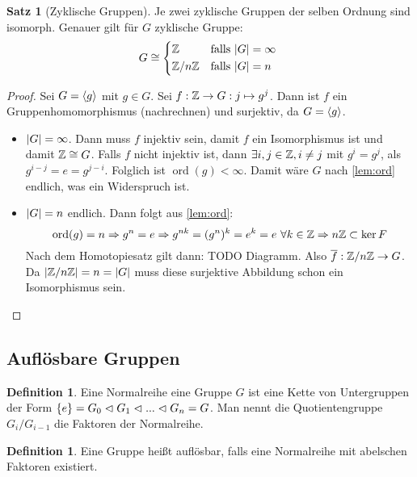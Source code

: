 \documentclass[12pt,a4paper]{article}
\newcounter{thmcounter}[subsection]
\newcounter{defcounter}[subsection]
\theoremstyle{definition}
\newtheorem{defi}[defcounter]{Definition}
\theoremstyle{remark}
\theoremstyle{definition}
\newtheorem{satz}[thmcounter]{Satz}
\theoremstyle{definition}
\theoremstyle{plain}
\theoremstyle{plain}
\DeclarePairedDelimiter{\abs}{\lvert}{\rvert}
\DeclareMathOperator{\ord}{ord}
\begin{document}
\begin{satz}[Zyklische Gruppen]
	Je zwei zyklische Gruppen der selben Ordnung sind isomorph. Genauer gilt für $G$ zyklische Gruppe: 
	\begin{equation*}
		G \cong \begin{cases*}
			\IZ &falls $\abs G = \infty$ \\
			\IZ/n\IZ &falls $\abs G = n$
		\end{cases*}
	\end{equation*}
\end{satz}

\begin{proof}
	Sei $G = \langle g\rangle$ mit $g \in G$. Sei $f: \mathbb Z \rightarrow G : j \mapsto g^j$. Dann ist $f$ ein Gruppenhomomorphismus (nachrechnen) und surjektiv, da $G = \langle g\rangle$.
	\begin{itemize}
		\item[Fall 1] $\abs G = \infty$. Dann muss $f$ injektiv sein, damit $f$ ein Isomorphismus ist und damit $\mathbb Z \cong G$. Falls $f$ nicht injektiv ist, dann $\exists i,j \in \mathbb Z, i\neq j$ mit $g^i=g^j$, als $g^{i-j} = e = g^{j-i}$. Folglich ist $\ord(g) < \infty$. Damit wäre $G$ nach \ref{lem:ord} endlich, was ein Widerspruch ist.
		\item[Fall 2] $\abs G = n$ endlich. Dann folgt aus \ref{lem:ord}: 
		\begin{equation*}
			\ord(g)=n \Rightarrow g^n = e \Rightarrow g^{nk} = (g^n)^k = e^k = e ~ \forall k\in \IZ \Rightarrow n\IZ \subset \ker F
		\end{equation*}
		Nach dem Homotopiesatz gilt dann: TODO Diagramm. Also $\overline{f} : \mathbb Z/n\mathbb Z \rightarrow G$. Da $\abs{\IZ/n\IZ} = n = \abs G$ muss diese surjektive Abbildung schon ein Isomorphismus sein.
	\end{itemize}
\end{proof}

\subsection{Auflösbare Gruppen}
\begin{defi}
	Eine Normalreihe eine Gruppe $G$ ist eine Kette von Untergruppen der Form $\left\lbrace e\right\rbrace = G_0 \vartriangleleft G_1 \vartriangleleft ... \vartriangleleft G_n = G$. Man nennt die Quotientengruppe $G_i/G_{i-1}$ die Faktoren der Normalreihe.
\end{defi}

\begin{defi}
	Eine Gruppe heißt auflösbar, falls eine Normalreihe mit abelschen Faktoren existiert.
\end{defi}
\end{document}
